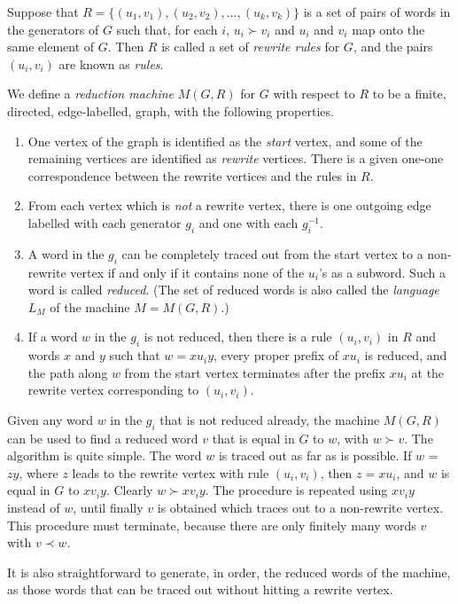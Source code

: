 Suppose that $R = \{ (u_1,v_1), (u_2,v_2), \ldots , (u_k,v_k) \}$ is a set of
pairs of words in the generators of $G$ such that, for each $i$, 
$u_i \succ v_i$ and $u_i$ and $v_i$ map onto the same element of $G$.
Then $R$ is called a set of {\em rewrite rules} for $G$,
and the pairs $(u_i,v_i)$ are known as {\em rules}.

We define a {\em reduction machine} $M(G,R)$ for $G$ with respect to $R$ to be a
finite, directed, edge-labelled, graph, 
with the following properties.
\begin{enumerate} 
\item
One vertex of the graph is identified as the {\em start} vertex, and
some of the remaining vertices are identified as {\em rewrite} vertices.
There is a given one-one correspondence between the rewrite vertices and the
rules in $R$.
\item 
From each vertex which is {\em not} a rewrite vertex, there is one
outgoing edge labelled with each generator $g_i$ and one with each $g_i^{-1}$.
\item
A word in the $g_i$ can be completely traced out from the start vertex to a
non-rewrite
vertex if and only if it contains none of the $u_i$'s as a subword. Such a
word is called {\em reduced}. (The set of reduced words is also called the
{\em language} $L_M$ of the machine $M = M(G,R)$.)
\item
If a word $w$ in the $g_i$ is not reduced, then there is a rule $(u_i,v_i)$
in $R$ and words $x$ and $y$ such that $w=xu_iy$, every proper prefix of
$xu_i$ is reduced, and the path along $w$ from the start vertex terminates
after the prefix $xu_i$ at the rewrite vertex corresponding to $(u_i,v_i)$.
\end{enumerate}

Given any word $w$ in the $g_i$ that is not reduced already,
the machine $M(G,R)$ can be used to find a reduced word $v$ that is equal in
$G$ to $w$, with $w \succ v$. The algorithm
is quite simple. The word $w$ is traced out as far as is possible.
If $w$ = $zy$,
where $z$ leads to the rewrite vertex with rule $(u_i,v_i)$,
then $z = xu_i$, and $w$ is equal in $G$
to $xv_iy$. Clearly $w \succ xv_iy$. 
The procedure is repeated using $xv_iy$ instead
of $w$, until finally $v$ is obtained which traces out to a non-rewrite
vertex. This procedure must terminate, because there are only finitely many
words $v$ with $v\prec w$.

It is also straightforward to generate, in order, the reduced words of the
machine, as those words that can be traced out without hitting a rewrite
vertex.

